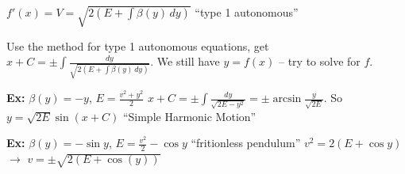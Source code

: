 \documentclass[10pt,letterpaper]{article}
\newcommand{\n}{\hfill\break}
\newcommand{\ex}[1]{\par\noindent\settowidth{\hangindent}{\textbf{Ex: }}\textbf{Ex: }#1\n}
\begin{document}
\par\noindent $f'(x)=V=\sqrt{2(E+\int\beta(y)\,dy)}$ ``type 1 autonomous''\n

\par\noindent Use the method for type 1 autonomous equations, get $\displaystyle{}x+C=\pm\int\frac{dy}{\sqrt{2(E+\int\beta(y)\,dy)}}$.\n
We still have $y=f(x)$ -- try to solve for $f$.\n

\ex{$\beta(y)=-y$, $E=\frac{v^{2}+y^{2}}{2}$\n
\n
$\displaystyle{}x+C=\pm\int\frac{dy}{\sqrt{2E-y^{2}}}=\pm\arcsin\frac{y}{\sqrt{2E}}$.\n
\n
So $y=\sqrt{2E}\sin(x+C)$ ``Simple Harmonic Motion''}

\ex{$\beta(y)=-\sin{}y$, $E=\frac{v^{2}}{2}-\cos{}y$ ``fritionless pendulum''\n
\n
$v^{2}=2(E+\cos{}y)$ $\to$ $v=\pm\sqrt{2(E+\cos(y))}$}
\end{document}
